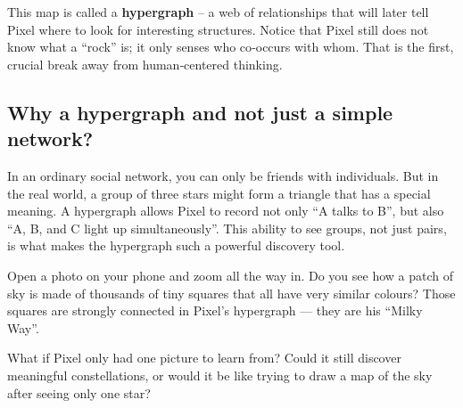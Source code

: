 This map is called a \textbf{hypergraph} – a web of relationships that
will later tell Pixel where to look for interesting structures.  Notice
that Pixel still does not know what a “rock” is; it only senses who
co‑occurs with whom.  That is the first, crucial break away from
human‑centered thinking.

\subsection*{Why a hypergraph and not just a simple network?}

In an ordinary social network, you can only be friends with
individuals.  But in the real world, a group of three stars might form
a triangle that has a special meaning.  A hypergraph allows Pixel to
record not only “A talks to B”, but also “A, B, and C light up
simultaneously”.  This ability to see groups, not just pairs, is what
makes the hypergraph such a powerful discovery tool.

\begin{tcolorbox}[colback=blue!5, colframe=blue!40, title=Try this at home]
Open a photo on your phone and zoom all the way in.
Do you see how a patch of sky is made of thousands of tiny squares
that all have very similar colours?  Those squares are strongly
connected in Pixel’s hypergraph — they are his “Milky Way”.
\end{tcolorbox}

\begin{tcolorbox}[colback=orange!5, colframe=orange!60, title=\textbf{What if...?}]
What if Pixel only had one picture to learn from?  Could it still
discover meaningful constellations, or would it be like trying to draw
a map of the sky after seeing only one star?
\end{tcolorbox}